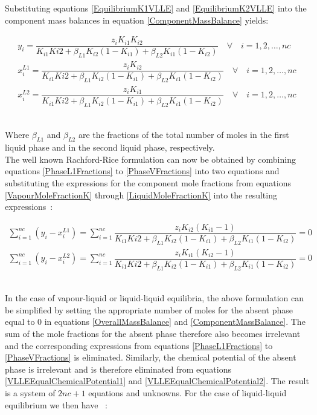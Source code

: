 Substituting eqautions \ref{EquilibriumK1VLLE} and \ref{EquilibriumK2VLLE} into the component mass balances in equation \ref{ComponentMassBalance} yields:\

\begin{eqnarray}
y_{i} = \dfrac{z_{i}K_{i1}K_{i2}}{K_{i1}K{i2}+\beta_{L1}K_{i2}\left(1-K_{i1}\right) + \beta_{L2}K_{i1}\left(1-K_{i2}\right)}  \quad \forall \quad i = 1, 2,\ldots, nc \label{VapourMoleFractionK}\\
x_{i}^{L1} = \dfrac{z_{i}K_{i2}}{K_{i1}K{i2}+\beta_{L1}K_{i2}\left(1-K_{i1}\right) + \beta_{L2}K_{i1}\left(1-K_{i2}\right)}  \quad \forall \quad i = 1, 2,\ldots, nc\\
x_{i}^{L2} = \dfrac{z_{i}K_{i1}}{K_{i1}K{i2}+\beta_{L1}K_{i2}\left(1-K_{i1}\right) + \beta_{L2}K_{i1}\left(1-K_{i2}\right)}  \quad \forall \quad i = 1, 2,\ldots, nc \label{LiquidMoleFractionK}
\end{eqnarray}\

Where $\beta_{L1}$ and $\beta_{L2}$ are the fractions of the total number of moles in the first liquid phase and in the second liquid phase, respectively.\\

The well known Rachford-Rice formulation can now be obtained by combining equations \ref{PhaseL1Fractions} to \ref{PhaseVFractions} into two equations and substituting the expressions for the component mole fractions from equations \ref{VapourMoleFractionK} through \ref{LiquidMoleFractionK} into the resulting expressions~\cite{PhaseEquilCalcsESandGEM, ThermodynamicModels, ComputerCalculationsVLEandLLE, HybridFlashCalculations}:\

\begin{eqnarray}
\sum_{i=1}^{nc}\left(y_{i}-x_{i}^{L1}\right) = \sum_{i=1}^{nc}\dfrac{z_{i}K_{i2}\left(K_{i1}-1\right)}{K_{i1}K{i2}+\beta_{L1}K_{i2}\left(1-K_{i1}\right) + \beta_{L2}K_{i1}\left(1-K_{i2}\right)} = 0\\
\sum_{i=1}^{nc}\left(y_{i}-x_{i}^{L2}\right) = \sum_{i=1}^{nc}\dfrac{z_{i}K_{i1}\left(K_{i2}-1\right)}{K_{i1}K{i2}+\beta_{L1}K_{i2}\left(1-K_{i1}\right) + \beta_{L2}K_{i1}\left(1-K_{i2}\right)} = 0
\end{eqnarray}\

In the case of vapour-liquid or liquid-liquid equilibria, the above formulation can be simplified by setting the appropriate number of moles for the absent phase equal to 0 in equations \ref{OverallMassBalance} and \ref{ComponentMassBalance}. The sum of the mole fractions for the absent phase therefore also becomes irrelevant and the corresponding expressions from equations \ref{PhaseL1Fractions} to \ref{PhaseVFractions} is eliminated. Similarly, the chemical potential of the absent phase is irrelevant and is therefore eliminated from equations \ref{VLLEEqualChemicalPotential1} and \ref{VLLEEqualChemicalPotential2}. The result is a system of $2nc+1$ equations and unknowns. For the case of liquid-liquid equilibrium we then have ~\cite{PhaseEquilCalcsESandGEM, HybridFlashCalculations}:\

